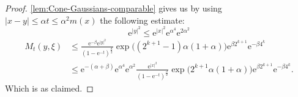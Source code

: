 \documentclass[a4paper,oneside,10pt]{amsproc}
\theoremstyle{remark}
\renewcommand{\leq}{\leqslant}
\renewcommand{\leq}{\leqslant}
\newcommand{\e}{\mathrm{e}} %
\renewcommand{\leq}{\leqslant}%
\begin{document}
\begin{proof}
  \autoref{lem:Cone-Gaussians-comparable} gives us
  by using $|x - y| \leq \alpha t \leq \alpha^2 m(x)$ the following estimate:
  \begin{equation*}
    \e^{|y|^2} \leq \e^{|x|^2}  \e^{\alpha^4} \e^{2\alpha^2}
  \end{equation*}
  \begin{align*}
    M_t(y, \xi) &\leq \frac{\e^{-\beta} \e^{|y|^2}}{(1 - \e^{-t})^{\frac{d}2}}
    \exp\bigl((2^{k + 1} - 1) \alpha (1 + \alpha) \bigr) \e^{\beta
      2^{k + 1}} \e^{-\beta 4^k}\\
    &\leq \e^{-(\alpha + \beta)} \e^{\alpha^4} \e^{\alpha^2} \frac{ \e^{|x|^2} }{(1 - \e^{-t})^{\frac{d}2}}
    \exp\bigl(2^{k + 1} \alpha (1 + \alpha) \bigr)  \e^{\beta 2^{k + 1}} \e^{-\beta 4^k}.
  \end{align*}
  Which is as claimed.
\end{proof}
\end{document}
